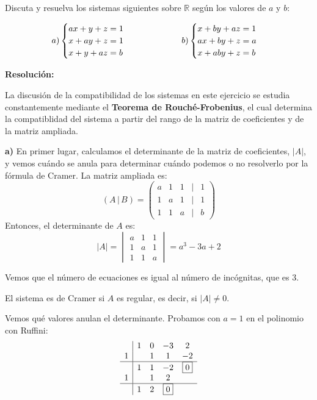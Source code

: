 \documentclass[a4paper,12pt]{article}
\begin{document}
\begin{ejercicio}[title=Ejercicio 31]
Discuta y resuelva los sistemas siguientes sobre $\mathbb{R}$ según los valores de $a$ y $b$:

\[
\begin{tabular}{c @{\hspace{2cm}} c}
$a)\begin{cases}
a x + y + z = 1\\
x + a y + z = 1\\
x + y + a z = b
\end{cases}$ &
$b)\begin{cases}
x + b y + a z = 1\\
a x + b y + z = a\\
x + a b y + z = b
\end{cases}$
\end{tabular}
\]

\tcblower
\textbf{Resolución:}

La discusión de la compatibilidad de los sistemas en este ejercicio se estudia constantemente mediante el \textbf{Teorema de Rouché-Frobenius}, el cual determina la compatiblidad del sistema a partir del rango de la matriz de coeficientes y de la matriz ampliada.

\vspace{0.5em}

\textbf{a)}
En primer lugar, calculamos el determinante de la matriz de coeficientes, $|{A}|$, y vemos cuándo se anula para determinar cuándo podemos o no resolverlo por la fórmula de Cramer.
La matriz ampliada es:
$$({A}\,|\,{B}) =
\begin{pmatrix}
a & 1 & 1 &\Big|& 1\\
1 & a & 1 &\Big|& 1\\
1 & 1 & a &\Big|& b
\end{pmatrix}$$
Entonces, el determinante de ${A}$ es:
$$|{A}| =
\begin{vmatrix}
a & 1 & 1\\
1 & a & 1\\
1 & 1 & a
\end{vmatrix}
= a^3 - 3a + 2$$

Vemos que el número de ecuaciones es igual al número de incógnitas, que es 3.

El sistema es de Cramer si ${A}$ es regular, es decir, si $|{A}| \neq 0$.

Vemos qué valores anulan el determinante. Probamos con $a=1$ en el polinomio con Ruffini:
$$
\begin{array}{c|cccc}
  & 1 & 0 & -3 & 2 \\
1 &   & 1 & 1 & -2 \\
\hline
  & 1 & 1 & -2 & \boxed{0} \\
1 &   & 1 & 2 \\
\hline
  & 1 & 2 & \boxed{0}
\end{array}
$$


\end{ejercicio}
\end{document}
